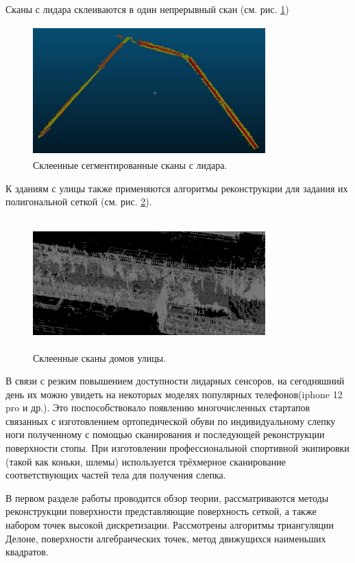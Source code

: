 \newpage

Сканы с лидара склеиваются в один непрерывный скан (см. рис. \ref{fig:-1})

\begin{figure}[h]
    \centering
    \includegraphics[width=0.8\textwidth, height=5cm]{images/glued.jpg}
    \caption{Склеенные сегментированные сканы с лидара.}
    \label{fig:-1}
\end{figure}

К зданиям с улицы также применяются алгоритмы реконструкции для задания их полигональной сеткой (см. рис. \ref{fig:street}).

\begin{figure}[h]
    \centering
    \includegraphics[width=0.8\textwidth, height=5cm]{images/street.png}
    \caption{Склеенные сканы домов улицы.}
    \label{fig:street}
\end{figure}

В связи с резким повышением доступности лидарных сенсоров, на сегодняшний день их можно увидеть на некоторых моделях популярных телефонов(iphone 12 pro и др.). Это поспособствовало появлению многочисленных стартапов связанных с изготовлением ортопедической обуви по индивидуальному слепку ноги полученному с помощью сканирования и последующей реконструкции поверхности стопы. При изготовлении профессиональной спортивной экипировки (такой как коньки, шлемы) используется трёхмерное сканирование соответствующих частей тела для получения слепка.


В первом разделе работы проводится обзор теории, рассматриваются методы реконструкции поверхности представляющие поверхность сеткой, а также набором точек высокой дискретизации. Рассмотрены алгоритмы триангуляции Делоне, поверхности алгебраических точек, метод движущихся наименьших квадратов.

